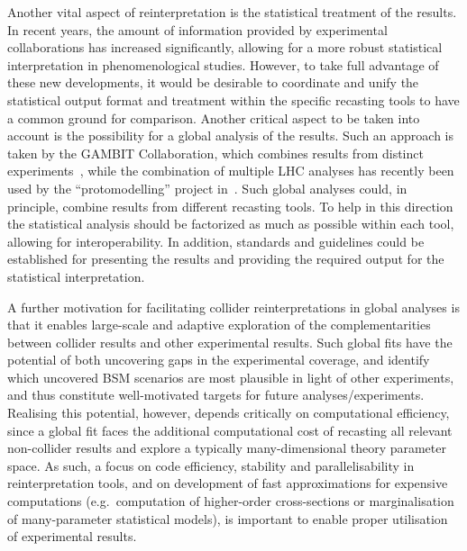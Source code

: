 \documentclass[11pt]{article}
\begin{document}
Another vital aspect of reinterpretation is the statistical treatment of the results. In recent years, the amount of information provided by experimental collaborations has increased significantly, allowing for a more robust statistical interpretation in phenomenological studies. However, to take full advantage of these new developments, it would be desirable to coordinate and unify the statistical output format and treatment within the specific recasting tools to have a common ground for comparison. Another critical aspect to be taken into account is the possibility for a global analysis of the results. Such an approach is taken by the GAMBIT Collaboration, which combines results from distinct experiments~\cite{Kvellestad:2019vxm}, while the combination of multiple LHC analyses has recently been used by the ``protomodelling'' project in~\cite{Waltenberger:2020ygp}. Such global analyses could, in principle, combine results from different recasting tools.
To help in this direction the statistical analysis should be factorized as much as possible within each tool, allowing for interoperability. In addition,  standards and guidelines could be established for presenting the results and providing the required output for the statistical interpretation.

A further motivation for facilitating collider reinterpretations in global analyses is that it enables large-scale and adaptive exploration of the complementarities between collider results and other experimental results. Such global fits have the potential of both uncovering gaps in the experimental coverage, and identify which uncovered BSM scenarios are most plausible in light of other experiments, and thus constitute well-motivated targets for future analyses/experiments. Realising this potential, however, depends critically on computational efficiency, since a global fit faces the additional computational cost of recasting all relevant non-collider results and explore a typically many-dimensional theory parameter space. As such, a focus on code efficiency, stability and parallelisability in reinterpretation tools, and on development of fast approximations for expensive computations (e.g.~computation of higher-order cross-sections or marginalisation of many-parameter statistical models), is important to enable proper utilisation of experimental results.
\end{document}
